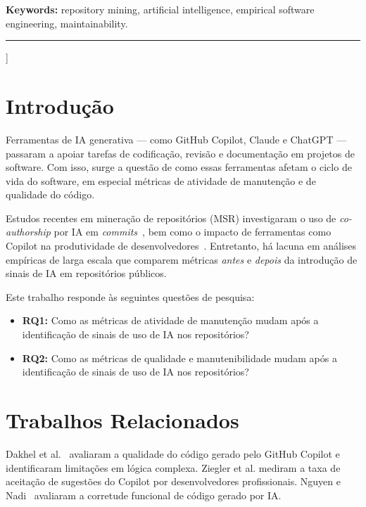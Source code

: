 \documentclass[12pt,a4paper,twocolumn]{article}
\begin{document}
{\begin{@twocolumnfalse}
\noindent\textbf{Keywords:} repository mining, artificial intelligence,
empirical software engineering, maintainability.

\noindent\rule{\linewidth}{0.5pt}
\vspace{0.6em}
\end{@twocolumnfalse}
}]

\section{Introdução}

Ferramentas de IA generativa --- como GitHub Copilot, Claude e ChatGPT --- passaram a
apoiar tarefas de codificação, revisão e documentação em projetos de software. Com isso,
surge a questão de como essas ferramentas afetam o ciclo de vida do software, em especial
métricas de atividade de manutenção e de qualidade do código.

Estudos recentes em mineração de repositórios (MSR) investigaram o uso de
\textit{co-authorship} por IA em \textit{commits}~\cite{dakhel2023copilot},
bem como o impacto de ferramentas como Copilot na produtividade de
desenvolvedores~\cite{ziegler2022copilot}. Entretanto, há lacuna em análises
empíricas de larga escala que comparem métricas \textit{antes} e \textit{depois}
da introdução de sinais de IA em repositórios públicos.

Este trabalho responde às seguintes questões de pesquisa:

\begin{itemize}[leftmargin=1.2em, itemsep=2pt]
  \item \textbf{RQ1:} Como as métricas de atividade de manutenção mudam após a
    identificação de sinais de uso de IA nos repositórios?
  \item \textbf{RQ2:} Como as métricas de qualidade e manutenibilidade mudam após a
    identificação de sinais de uso de IA nos repositórios?
\end{itemize}

\section{Trabalhos Relacionados}

Dakhel et al.~\cite{dakhel2023copilot} avaliaram a qualidade do código gerado pelo
GitHub Copilot e identificaram limitações em lógica complexa. Ziegler et al.
\cite{ziegler2022copilot} mediram a taxa de aceitação de sugestões do Copilot por
desenvolvedores profissionais. Nguyen e Nadi~\cite{nguyen2022copilot} avaliaram
a corretude funcional de código gerado por IA.
\end{document}
